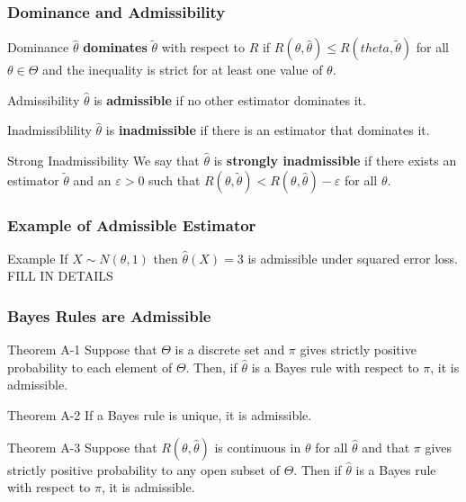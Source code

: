 \begin{frame}
  \frametitle{Dominance and Admissibility}

  \begin{block}{Dominance}
$\widehat{\theta}$ \textbf{dominates} $\widetilde{\theta}$ with respect to $R$ if $R(\theta,\widehat{\theta}) \leq R(theta,\widetilde{\theta})$ for all $\theta \in \Theta$ and the inequality is strict for at least one value of  $\theta$. 
  \end{block}

  \begin{block}{Admissibility}
$\widehat{\theta}$ is \textbf{admissible} if no other estimator dominates it.
  \end{block}

  \begin{alertblock}{Inadmissiblility}
    $\widehat{\theta}$ is \textbf{inadmissible} if there is an estimator that dominates it. 
  \end{alertblock}

  \begin{block}{Strong Inadmissibility}
    We say that $\widehat{\theta}$ is \textbf{strongly inadmissible} if there exists an estimator $\widetilde{\theta}$ and an $\varepsilon > 0$ such that $R(\theta, \widetilde{\theta}) < R(\theta, \widehat{\theta}) - \varepsilon$ for all $\theta$.
  \end{block}
\end{frame}
\begin{frame}
  \frametitle{Example of Admissible Estimator}


  \begin{block}{Example}
    If $X\sim N(\theta, 1)$ then $\widehat{\theta}(X) = 3$ is admissible under squared error loss. \alert{FILL IN DETAILS}
  \end{block}

\end{frame}
\begin{frame}
  \frametitle{Bayes Rules are Admissible}

  \begin{block}{Theorem A-1}
    Suppose that $\Theta$ is a discrete set and $\pi$ gives strictly positive probability to each element of $\Theta$.
    Then, if $\widehat{\theta}$ is a Bayes rule with respect to $\pi$, it is admissible.
  \end{block}

  \begin{block}{Theorem A-2}
    If a Bayes rule is unique, it is admissible.
  \end{block}

  \begin{block}{Theorem A-3}
    Suppose that $R(\theta, \widehat{\theta})$ is continuous in $\theta$ for all $\widehat{\theta}$ and that $\pi$ gives strictly positive probability to any open subset of $\Theta$. 
    Then if $\widehat{\theta}$ is a Bayes rule with respect to $\pi$, it is admissible.
  \end{block}

\end{frame}
